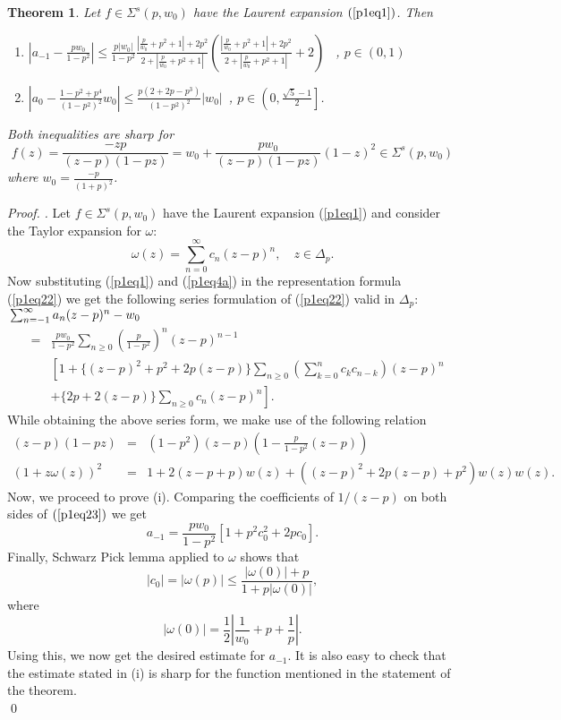 \documentclass[leqno,
12pt]{amsart}
\newtheorem{thm}{Theorem}[section]
\theoremstyle{definition}
\newenvironment{pf}[1][]{ \vskip 3mm
 \noindent
 \ifthenelse{\equal{#1}{}}  {{\slshape Proof. }}  {{\slshape #1.} } }{\qed\bigskip}
\begin{document}
\begin{thm}\label{1th6}
Let $f\in\Sigma^s(p, w_0)$ have the Laurent expansion $(\ref{p1eq1})$. Then
\begin{enumerate}
\item[(i)] $\displaystyle
\left|a_{-1}-\frac{pw_0}{1-p^2}\right|\leq \frac{p|w_0|}{1-p^2}
\frac{|\frac{p}{w_0}+p^2+1|+2p^2}{2+|\frac{p}{w_0}+p^2+1|}
\left(\frac{|\frac{p}{w_0}+p^2+1|+2p^2}{2+|\frac{p}{w_0}+p^2+1|}
+2\right)$ ~, $p\in (0,1)$
\item[(ii)] $\displaystyle
 \left |a_0-\frac{1-p^2+p^4}{(1-p^2)^2}w_0\right|\leq \frac{p(2+2p-p^3)}{(1-p^2)^2}|w_0|
$~, $ p\in \left(0,\frac{\sqrt5 -1}{2}\right]$.
\end{enumerate}
Both inequalities are sharp for
$$
f(z)=\frac{-zp}{(z-p)(1-pz)}= w_0+\frac{pw_0}{(z-p)(1-pz)}(1-z)^2\in \Sigma^{s}(p, w_0)
$$
where $w_0=\frac{-p}{(1+p)^2}$.
\end{thm}\begin{pf}
Let $f\in\Sigma^s(p, w_0)$ have the Laurent expansion (\ref{p1eq1})
and  consider the Taylor expansion  for $\omega$:
$$\omega(z)=\sum_{n=0}^{\infty}c_n(z-p)^n, \quad z\in\Delta_p.
$$
Now substituting (\ref{p1eq1}) and (\ref{p1eq4a}) in the representation formula
(\ref{p1eq22}) we get the following  series formulation of  (\ref{p1eq22}) valid in $\Delta_p$:\\

${\displaystyle} \sum_{n=-1}^{\infty} a_n(z-p)^n-w_0$
\begin{eqnarray}\label{p1eq23}
&=& \frac{pw_0}{1-p^2}\sum_{n\geq 0}\left(\frac{p}{1-p^2}\right)^n (z-p)^{n-1}\\
\nonumber && \left[1+\{(z-p)^2+p^2+2p(z-p)\}\sum_{n\geq 0}\right.\left(\sum_{k=0}^{n}c_k c_{n-k}\right)(z-p)^n\\
\nonumber && \left.+\{2p+2(z-p)\}\sum_{n\geq 0}c_n(z-p)^n\right].
\end{eqnarray}
While obtaining the above series form, we make use of the following relation
\begin{eqnarray*}
(z-p)(1-pz) &=& (1-p^2)(z-p)\left (1- \frac{p}{1-p^2}(z-p) \right )\\
(1+z\omega(z))^2 &=& 1+ 2(z-p+p)w(z)+ ((z-p)^2+2p(z-p) +p^2)w(z)w(z).
\end{eqnarray*}
Now, we proceed to prove (i).
Comparing the coefficients of $1/(z-p)$ on both sides of $(\ref{p1eq23})$ we get
$$a_{-1}=\frac{pw_0}{1-p^2}[1+p^2c_0^2+2pc_0].
$$
Finally, Schwarz Pick lemma applied to $\omega$ shows that
$$|c_0|=|\omega(p)|\leq \frac{|\omega(0)|+p}{1+p|\omega(0)|},
$$
where
$$|\omega(0)|=\frac{1}{2}\left|\frac{1}{w_0}+p+\frac{1}{p}\right| .
$$
Using this, we now get the desired estimate for $a_{-1}$.
It is also easy to check that the estimate stated in (i)
is sharp for the function mentioned in the statement of the theorem.\\


\end{pf}
\end{document}
